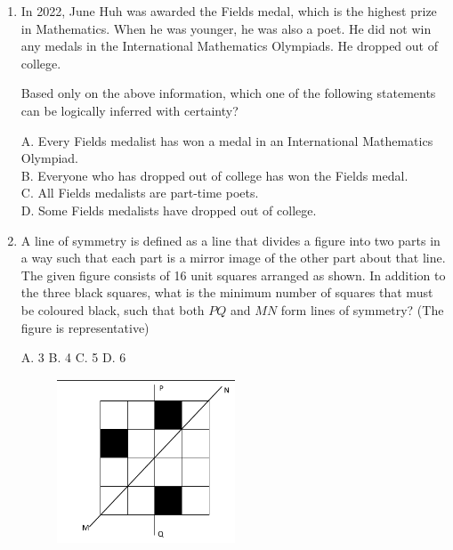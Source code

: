 \documentclass[journal,12pt,onecolumn]{IEEEtran}
\begin{document}
\begin{enumerate}
    \item In 2022, June Huh was awarded the Fields medal, which is the highest prize in Mathematics. When he was younger, he was also a poet. He did not win any medals in the International Mathematics Olympiads. He dropped out of college.

    Based only on the above information, which one of the following statements can be logically inferred with certainty?

    A. Every Fields medalist has won a medal in an International Mathematics Olympiad. \\
    B. Everyone who has dropped out of college has won the Fields medal. \\
    C. All Fields medalists are part-time poets. \\
    D. Some Fields medalists have dropped out of college.

    \item A line of symmetry is defined as a line that divides a figure into two parts in a way such that each part is a mirror image of the other part about that line. The given figure consists of 16 unit squares arranged as shown. In addition to the three black squares, what is the minimum number of squares that must be coloured black, such that both $PQ$ and $MN$ form lines of symmetry? (The figure is representative)

    A. 3 \quad
    B. 4 \quad
    C. 5 \quad
    D. 6

    \begin{figure}[h] 
    \centering
    \includegraphics[width=0.5\textwidth]{figs/qn5.png}
    \caption{}
\label{fig:q5graph}
\end{figure}

\begin{center}
\end{center}

\end{enumerate}
\end{document}
